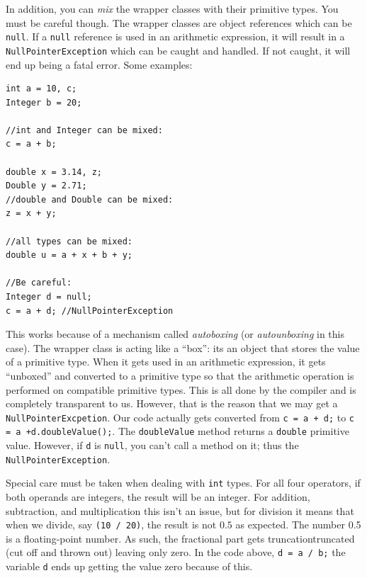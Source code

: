 In addition, you can \emph{mix} the wrapper classes with their primitive types.
You must be careful though.  The wrapper classes are object references which
can be \texttt{null}.  If a \texttt{null} reference is used
in an arithmetic expression, it will result in a \texttt{NullPointerException}
which can be caught and handled.  If not caught, it will end up being a fatal
error.  Some examples:

\begin{verbatim}
int a = 10, c;
Integer b = 20;

//int and Integer can be mixed:
c = a + b;

double x = 3.14, z;
Double y = 2.71;
//double and Double can be mixed:
z = x + y;

//all types can be mixed:
double u = a + x + b + y;

//Be careful:
Integer d = null;
c = a + d; //NullPointerException
\end{verbatim}

This works because of a mechanism called \emph{autoboxing} (or \emph{autounboxing} in
this case).  The wrapper class is acting like a ``box'': its an object that stores
the value of a primitive type.  When it gets used in an arithmetic expression, it
gets ``unboxed'' and converted to a primitive type so that the arithmetic
operation is performed on compatible primitive types.  This is all done by the 
compiler and is completely transparent to us.  However, that is the reason that
we may get a \texttt{NullPointerExcpetion}.  Our code actually gets
converted from \texttt{c = a + d;} to \texttt{c = a +d.doubleValue();}.
The \texttt{doubleValue} method returns a \texttt{double} primitive
value.  However, if \texttt{d} is \texttt{null}, you can't call
a method on it; thus the \texttt{NullPointerException}.

Special care must be taken when dealing with \texttt{int} types.  
For all four operators, if both operands are integers, the result will be an
integer.  For addition, subtraction, and multiplication this isn't an issue, but
for division it means that when we divide, say \texttt{(10 / 20)}, the result
is not $0.5$ as expected.  The number 0.5 is a floating-point number.  As
such, the fractional part gets \gls{truncation}{truncated} (cut off and thrown out) leaving
only zero.  In the code above, \texttt{d = a / b;} the variable \texttt{d}
ends up getting the value zero because of this.

